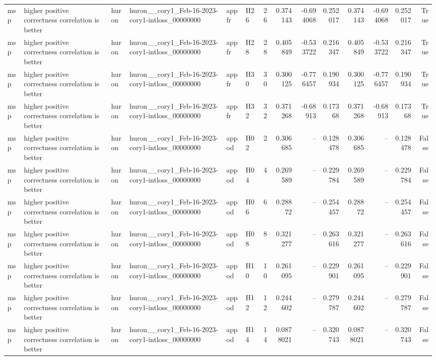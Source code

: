 \begin{longtable}{llllllrrrrrrrr}
msp & higher positive correctness correlation is better & huron & huron\_\_cory1\_Feb-16-2023-cory1-intloss\_00000000 & appfr & H26 & 26 & 0.374143 & -0.694068 & 0.252017 & 0.374143 & -0.694068 & 0.252017 & True \\
msp & higher positive correctness correlation is better & huron & huron\_\_cory1\_Feb-16-2023-cory1-intloss\_00000000 & appfr & H28 & 28 & 0.405849 & -0.533722 & 0.216347 & 0.405849 & -0.533722 & 0.216347 & True \\
msp & higher positive correctness correlation is better & huron & huron\_\_cory1\_Feb-16-2023-cory1-intloss\_00000000 & appfr & H30 & 30 & 0.300125 & -0.776457 & 0.190934 & 0.300125 & -0.776457 & 0.190934 & True \\
msp & higher positive correctness correlation is better & huron & huron\_\_cory1\_Feb-16-2023-cory1-intloss\_00000000 & appfr & H32 & 32 & 0.371268 & -0.68913 & 0.17368 & 0.371268 & -0.68913 & 0.17368 & True \\
msp & higher positive correctness correlation is better & huron & huron\_\_cory1\_Feb-16-2023-cory1-intloss\_00000000 & appod & H02 & 2 & 0.306685 & -- & 0.128478 & 0.306685 & -- & 0.128478 & False \\
msp & higher positive correctness correlation is better & huron & huron\_\_cory1\_Feb-16-2023-cory1-intloss\_00000000 & appod & H04 & 4 & 0.269589 & -- & 0.229784 & 0.269589 & -- & 0.229784 & False \\
msp & higher positive correctness correlation is better & huron & huron\_\_cory1\_Feb-16-2023-cory1-intloss\_00000000 & appod & H06 & 6 & 0.28872 & -- & 0.254457 & 0.28872 & -- & 0.254457 & False \\
msp & higher positive correctness correlation is better & huron & huron\_\_cory1\_Feb-16-2023-cory1-intloss\_00000000 & appod & H08 & 8 & 0.321277 & -- & 0.263616 & 0.321277 & -- & 0.263616 & False \\
msp & higher positive correctness correlation is better & huron & huron\_\_cory1\_Feb-16-2023-cory1-intloss\_00000000 & appod & H10 & 10 & 0.261095 & -- & 0.229901 & 0.261095 & -- & 0.229901 & False \\
msp & higher positive correctness correlation is better & huron & huron\_\_cory1\_Feb-16-2023-cory1-intloss\_00000000 & appod & H12 & 12 & 0.244602 & -- & 0.279787 & 0.244602 & -- & 0.279787 & False \\
msp & higher positive correctness correlation is better & huron & huron\_\_cory1\_Feb-16-2023-cory1-intloss\_00000000 & appod & H14 & 14 & 0.0878021 & -- & 0.320743 & 0.0878021 & -- & 0.320743 & False \\

\end{longtable}
